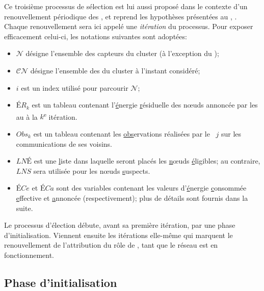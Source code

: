 Ce troisième processus de sélection est lui aussi proposé dans le contexte d'un renouvellement périodique des \cns, et reprend les hypothèses présentées au , .
Chaque renouvellement sera ici appelé une \emph{itération} du processus.
Pour exposer efficacement celui-ci, les notations suivantes sont adoptées:
\begin{itemize}
    \item $\mathcal{N}$ désigne l'ensemble des capteurs du cluster (à l'exception du \ch);
    \item $\mathcal{CN}$ désigne l'ensemble des \cns du cluster à l'instant considéré;
    \item $i$ est un index utilisé pour parcourir $\mathcal{N}$;
    \item $\mathit{ÉR}_k$ est un tableau contenant l'\underline{é}nergie \underline{r}ésiduelle des nœuds annoncée par les \cns au \ch à la $k$\textsuperscript{e} itération.
    \item $\mathit{Obs}_k$ est un tableau contenant les \underline{obs}ervations réalisées par le \cn~$j$ sur les communications de ses voisins.
    \item $\mathit{LNÉ}$ est une \underline{l}iste dans laquelle seront placés les \underline{n}œuds \underline{é}ligibles; au contraire, $\mathit{LNS}$ sera utilisée pour les nœuds \underline{s}uspects.
    \item $\mathit{ÉCe}$ et $\mathit{ÉCa}$ sont des variables contenant les valeurs d'\underline{é}nergie \underline{c}onsommée \underline{e}ffec\-tive et \underline{a}nnoncée (respectivement); plus de détails sont fournis dans la suite.
\end{itemize}

Le processus d'élection débute, avant sa première itération, par une phase d'initialisation.
Viennent ensuite les itérations elle-même qui marquent le renouvellement de l'attribution du rôle de \cn, tant que le réseau est en fonctionnement.

    \subsection{Phase d'initialisation}

